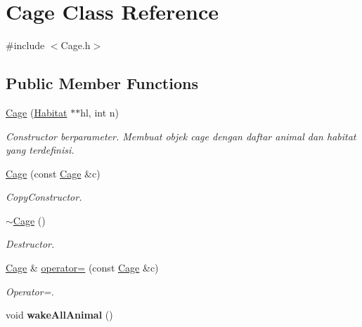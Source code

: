\hypertarget{classCage}{}\section{Cage Class Reference}
\label{classCage}


{\ttfamily \#include $<$Cage.\+h$>$}

\subsection*{Public Member Functions}
\begin{DoxyCompactItemize}
\item 
\hyperlink{classCage_a87cfc71acde51257611ce288e6337363}{Cage} (\hyperlink{classHabitat}{Habitat} $\ast$$\ast$hl, int n)
\begin{DoxyCompactList}\small\item\em Constructor berparameter. Membuat objek cage dengan daftar animal dan habitat yang terdefinisi. \end{DoxyCompactList}\item 
\hyperlink{classCage_ae85bb53517616422bf7f36282de01519}{Cage} (const \hyperlink{classCage}{Cage} \&c)\hypertarget{classCage_ae85bb53517616422bf7f36282de01519}{}\label{classCage_ae85bb53517616422bf7f36282de01519}

\begin{DoxyCompactList}\small\item\em Copy\+Constructor. \end{DoxyCompactList}\item 
\hyperlink{classCage_a657259499dfc23c63fc65aeaf8abbb17}{$\sim$\+Cage} ()\hypertarget{classCage_a657259499dfc23c63fc65aeaf8abbb17}{}\label{classCage_a657259499dfc23c63fc65aeaf8abbb17}

\begin{DoxyCompactList}\small\item\em Destructor. \end{DoxyCompactList}\item 
\hyperlink{classCage}{Cage} \& \hyperlink{classCage_a020eefd2b5d15915cf65693413be64db}{operator=} (const \hyperlink{classCage}{Cage} \&c)\hypertarget{classCage_a020eefd2b5d15915cf65693413be64db}{}\label{classCage_a020eefd2b5d15915cf65693413be64db}

\begin{DoxyCompactList}\small\item\em Operator=. \end{DoxyCompactList}\item 
void {\bfseries wake\+All\+Animal} ()\hypertarget{classCage_a1f5ebc229af63a1b24f596cf919e3f56}{}\label{classCage_a1f5ebc229af63a1b24f596cf919e3f56}

\end{DoxyCompactItemize}


